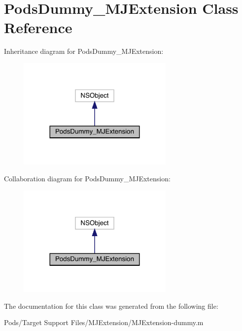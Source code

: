 \hypertarget{interface_pods_dummy___m_j_extension}{}\section{Pods\+Dummy\+\_\+\+M\+J\+Extension Class Reference}
\label{interface_pods_dummy___m_j_extension}


Inheritance diagram for Pods\+Dummy\+\_\+\+M\+J\+Extension\+:\nopagebreak
\begin{figure}[H]
\begin{center}
\leavevmode
\includegraphics[width=216pt]{interface_pods_dummy___m_j_extension__inherit__graph}
\end{center}
\end{figure}


Collaboration diagram for Pods\+Dummy\+\_\+\+M\+J\+Extension\+:\nopagebreak
\begin{figure}[H]
\begin{center}
\leavevmode
\includegraphics[width=216pt]{interface_pods_dummy___m_j_extension__coll__graph}
\end{center}
\end{figure}


The documentation for this class was generated from the following file\+:\begin{DoxyCompactItemize}
\item 
Pods/\+Target Support Files/\+M\+J\+Extension/M\+J\+Extension-\/dummy.\+m\end{DoxyCompactItemize}
